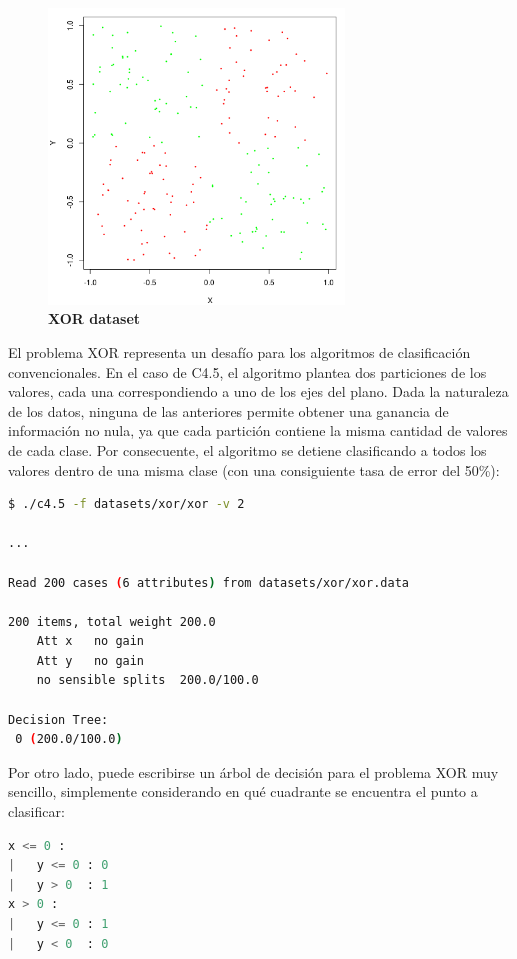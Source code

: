 \documentclass[a4paper, 11pt]{article} %
\begin{document}
\begin{figure}[H]
\captionsetup[subfigure]{labelformat=empty}
  \centering
  \caption*{\textbf{XOR dataset}}
  \includegraphics[width=0.7\textwidth]{xor_classes.png}
\end{figure}

El problema XOR representa un desafío para los algoritmos de clasificación
convencionales. En el caso de C4.5, el algoritmo plantea dos particiones de los
valores, cada una correspondiendo a uno de los ejes del plano. Dada la
naturaleza de los datos, ninguna de las anteriores permite obtener una ganancia
de información no nula, ya que cada partición contiene la misma cantidad de
valores de cada clase. Por consecuente, el algoritmo se detiene clasificando a
todos los valores dentro de una misma clase (con una consiguiente tasa de error
del 50\%):\\

\begin{lstlisting}[language=Bash, xleftmargin = 2cm]
$ ./c4.5 -f datasets/xor/xor -v 2

...

Read 200 cases (6 attributes) from datasets/xor/xor.data

200 items, total weight 200.0
	Att x	no gain
	Att y	no gain
	no sensible splits  200.0/100.0

Decision Tree:
 0 (200.0/100.0)
\end{lstlisting}

Por otro lado, puede escribirse un árbol de decisión para el problema XOR muy
sencillo, simplemente considerando en qué cuadrante se encuentra el punto a
clasificar:\\

\begin{lstlisting}[language=Python, xleftmargin = 2cm]
x <= 0 :
|   y <= 0 : 0
|   y > 0  : 1
x > 0 :
|   y <= 0 : 1
|   y < 0  : 0
\end{lstlisting}
\end{document}
